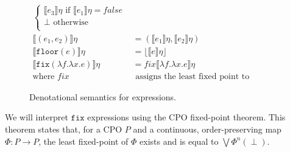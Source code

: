 \begin{figure}
\begin{align*}
\begin{cases}
      \llbracket e_3 \rrbracket\eta \text{ if } \llbracket e_1 \rrbracket\eta = false \\
      \perp \text{      otherwise} \\
   \end{cases}
  \\
  \llbracket (e_1,e_2) \rrbracket\eta &= (\llbracket e_1 \rrbracket\eta,\llbracket e_2 \rrbracket\eta) \\
  \llbracket \texttt{floor}(e) \rrbracket\eta &= \lfloor \llbracket e \rrbracket\eta \rfloor \\
   \llbracket  \texttt{fix} (\lambda f.\lambda x.e) \rrbracket\eta &= fix\llbracket \lambda f.\lambda x.e \rrbracket\eta \\
 \text{where } fix &\text{ assigns the least fixed point to continuous functions} 
 \end{align*}
 \caption{Denotational semantics for expressions.}
 \end{figure}
 
 We will interpret $\texttt{fix}$ expressions using the CPO fixed-point theorem. This theorem states that, for a CPO $P$ and a continuous, order-preserving map $\Phi : P \rightarrow P$, the least fixed-point of $\Phi$ exists and is equal to $\bigvee \Phi^n(\perp)$.

